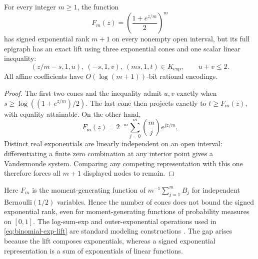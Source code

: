 \begin{proposition}
\label{prop:binomial-three-exp}
For every integer $m\geq1$, the function
\[
 F_m(z)=\left(\frac{1+e^{z/m}}2\right)^m
\]
has signed exponential rank $m+1$ on every nonempty open interval, but
its full epigraph has an exact lift using three exponential cones and
one scalar linear inequality:
\begin{equation}\label{eq:binomial-exp-lift}
 (z/m-s,1,u),\ (-s,1,v),\ (ms,1,t)\in K_{\exp},
 \qquad u+v\leq2.
\end{equation}
All affine coefficients have $O(\log(m+1))$-bit rational encodings.
\end{proposition}
\begin{proof}
The first two cones and the inequality admit $u,v$ exactly when
$s\geq\log((1+e^{z/m})/2)$. The last cone then projects exactly to
$t\geq F_m(z)$, with equality attainable. On the other hand,
\[
 F_m(z)=2^{-m}\sum_{j=0}^m\binom mj e^{jz/m}.
\]
Distinct real exponentials are linearly independent on an open interval:
differentiating a finite zero combination at any interior point gives
a Vandermonde system. Comparing any competing representation with this
one therefore forces all $m+1$ displayed nodes to remain.
\end{proof}

Here $F_m$ is the moment-generating function of
$m^{-1}\sum_{j=1}^m B_j$ for independent Bernoulli$(1/2)$ variables.
Hence the number of cones does not bound the signed exponential rank,
even for moment-generating functions of probability measures on $[0,1]$.
The
log-sum-exp and outer-exponential operations used in
\eqref{eq:binomial-exp-lift} are standard modeling constructions
\cite[Sections~5.2.5--5.2.6]{MosekExpoCookbook}. The gap arises because
the lift composes exponentials, whereas a signed exponential
representation is a sum of exponentials of linear functions.

